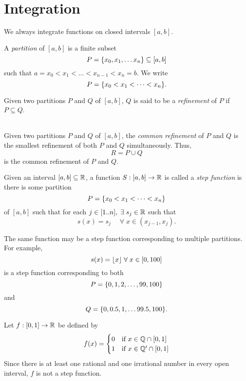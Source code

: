 
\section{Integration}
We always integrate functions on closed intervals $[a, b]$.

\begin{defn}[Partition] \label{defn:partition}
    A \emph{partition} of $[a, b]$ is a finite subset \[
        P = \set{x_{0}, x_{1}, \dots x_{n}} \subseteq [a, b]
    \] such that $a = x_{0} < x_{1} < \dots < x_{n-1} < x_{n} = b$.
    We write \[
        P = \set{x_{0} < x_{1} < \dots < x_{n}}.
    \]
\end{defn}

\begin{defn}[Refinement] \label{defn:refinement}
    Given two partitions $P$ and $Q$ of $[a, b]$, $Q$ is said to be a \emph{refinement} of $P$ if $P \subseteq Q$.
    
\end{defn}

\begin{defn} \label{defn:common refinement} ~\\
    Given two partitions $P$ and $Q$ of $[a, b]$, the \emph{common refinement} of $P$ and $Q$ is the smallest refinement of both $P$ and $Q$ simultaneously. Thus, \[
        R = P \cup Q
    \] is the common refinement of $P$ and $Q$.
\end{defn}

\begin{defn} \label{defn:step fn}
    Given an interval $[a, b] \subseteq \mathbb{R}$, a function $S : [a, b] \to \mathbb{R}$ is called a \emph{step function} is there is some partition \[
        P = \set{x_{0} < x_{1} < \dots < x_{n}}
    \] of $[a, b]$ such that for each $j \in [1 .. n], \;\exists\; s_{j} \in \mathbb{R}$ such that \[
        s(x) = s_{j} \quad \;\forall\; x \in (x_{j-1}, x_{j}).
    \]
\end{defn}
\begin{rem}
    The same function may be a step function corresponding to multiple partitions. For example, \[
        s(x) = \floor{x} \;\forall\; x \in [0, 100]
    \] is a step function corresponding to both \[
        P = \set{0, 1, 2, \dots, 99, 100}
    \] and \[
        Q = \set{0, 0.5, 1, \dots 99.5, 100}.
    \]
\end{rem}

\begin{example}
    Let $f : [0, 1] \to \mathbb{R}$ be defined by \[
        f(x) = \begin{cases}
            0 & \text{if } x \in \mathbb{Q} \cap [0, 1] \\
            1 & \text{if } x \in \mathbb{Q}' \cap [0, 1]
        \end{cases}
    \] Since there is at least one rational and one irrational number in every open interval, $f$ is not a step function.
\end{example}

